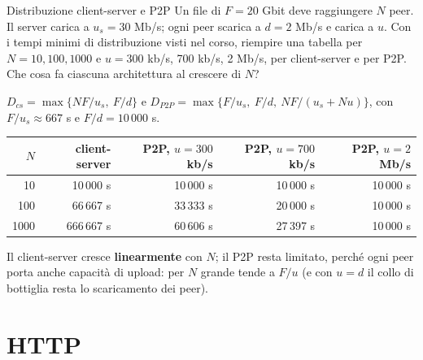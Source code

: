 \begin{esercizio}{Distribuzione client-server e P2P}
Un file di $F = 20$ Gbit deve raggiungere $N$ peer. Il server carica a $u_s = 30$ Mb/s; ogni peer scarica a $d = 2$ Mb/s e carica a $u$.
Con i tempi minimi di distribuzione visti nel corso, riempire una tabella per $N = 10, 100, 1000$ e $u = 300$ kb/s, 700 kb/s, 2 Mb/s, per
client-server e per P2P. Che cosa fa ciascuna architettura al crescere di $N$?

\svolgimento
$D_{cs} = \max\{NF/u_s,\ F/d\}$ e $D_{P2P} = \max\{F/u_s,\ F/d,\ NF/(u_s + Nu)\}$, con $F/u_s \approx 667$ s e $F/d = 10\,000$ s.
\begin{center}
\begin{tabular}{rrrrr}
\toprule
$N$ & client-server & P2P, $u = 300$ kb/s & P2P, $u = 700$ kb/s & P2P, $u = 2$ Mb/s \\
\midrule
10 & 10\,000 s & 10\,000 s & 10\,000 s & 10\,000 s \\
100 & 66\,667 s & 33\,333 s & 20\,000 s & 10\,000 s \\
1000 & 666\,667 s & 60\,606 s & 27\,397 s & 10\,000 s \\
\bottomrule
\end{tabular}
\end{center}
Il client-server cresce \textbf{linearmente} con $N$; il P2P resta limitato, perché ogni peer porta anche capacità di upload: per $N$
grande tende a $F/u$ (e con $u = d$ il collo di bottiglia resta lo scaricamento dei peer).
\end{esercizio}

\section{HTTP}

